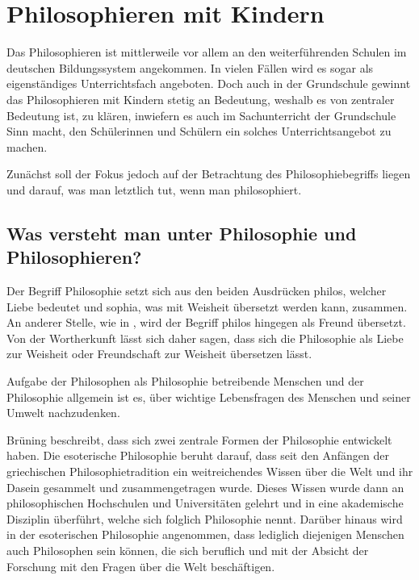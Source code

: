 \section{Philosophieren mit Kindern}

Das Philosophieren ist mittlerweile vor allem an den weiterführenden Schulen im deutschen Bildungssystem angekommen.
 In vielen Fällen wird es sogar als eigenständiges Unterrichtsfach angeboten. 
 Doch auch in der Grundschule gewinnt das Philosophieren mit Kindern stetig an Bedeutung, weshalb es von zentraler Bedeutung ist, zu klären, inwiefern es auch im Sachunterricht der 
 Grundschule Sinn macht, den Schülerinnen und Schülern ein solches Unterrichtsangebot zu machen. 
 
Zunächst soll der Fokus jedoch auf der Betrachtung des Philosophiebegriffs liegen und darauf, was man letztlich tut, wenn man philosophiert.



\subsection{Was versteht man unter Philosophie und Philosophieren?}

Der Begriff \glqq Philosophie\grqq{} setzt sich aus den beiden Ausdrücken \glqq philos\grqq{}, welcher Liebe bedeutet und \glqq sophia\grqq{}, was mit Weisheit übersetzt werden kann, zusammen\cite[S.\,8]{BB10}. 
An anderer Stelle, wie in \cite{GT16}, wird der Begriff \glqq philos\grqq{} hingegen als \glqq Freund\grqq{} übersetzt. 
Von der Wortherkunft lässt sich daher sagen, dass sich die Philosophie als \glqq Liebe zur Weisheit\grqq{} oder \glqq Freundschaft zur Weisheit\grqq{} übersetzen lässt. 

Aufgabe der Philosophen als Philosophie betreibende Menschen und der Philosophie allgemein ist es, \glqq über wichtige Lebensfragen\grqq{} des Menschen und seiner Umwelt nachzudenken\cite[S.\,8]{BB10}. 

Brüning beschreibt, dass sich zwei zentrale Formen der Philosophie entwickelt haben. 
Die esoterische Philosophie beruht darauf, dass seit den Anfängen der griechischen Philosophietradition ein weitreichendes Wissen über die Welt und ihr Dasein gesammelt und zusammengetragen wurde. 
Dieses Wissen wurde dann an philosophischen Hochschulen und Universitäten gelehrt und in eine akademische Disziplin überführt, welche sich folglich Philosophie nennt. 
Darüber hinaus wird in der esoterischen Philosophie angenommen, dass lediglich diejenigen Menschen auch Philosophen sein können, die sich beruflich und mit der Absicht der Forschung mit den Fragen über die Welt beschäftigen.

